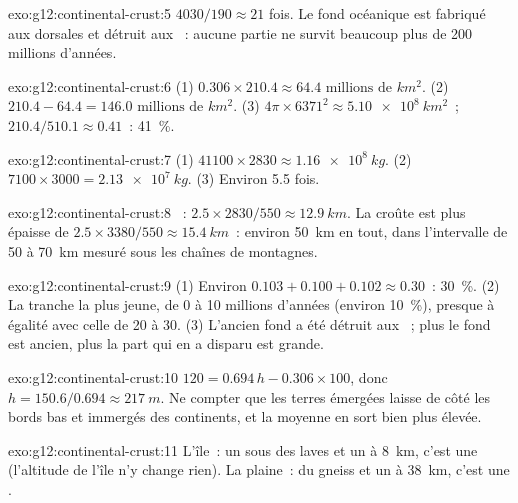 \begin{solution}{exo:g12:continental-crust:5}
$4030/190 \approx 21$ fois. Le fond océanique est fabriqué aux dorsales et
détruit aux ~: aucune partie ne survit beaucoup plus de
200 millions d'années.
\end{solution}

\begin{solution}{exo:g12:continental-crust:6}
(1) $0.306 \times 210.4 \approx \num{64.4}\text{ millions de }\unit{km^2}$.
(2) $210.4 - 64.4 = \num{146.0}\text{ millions de }\unit{km^2}$.
(3) $4\pi \times 6371^2 \approx \qty{5.10e8}{km^2}$~; $210.4/510.1 \approx
0.41$~: \qty{41}{\percent}.
\end{solution}

\begin{solution}{exo:g12:continental-crust:7}
(1) $41100 \times 2830 \approx \qty{1.16e8}{kg}$. (2) $7100 \times 3000 =
\qty{2.13e7}{kg}$. (3) Environ 5.5 fois.
\end{solution}

\begin{solution}{exo:g12:continental-crust:8}
~: $2.5 \times 2830/550 \approx \qty{12.9}{km}$. La croûte est plus
épaisse de $2.5 \times 3380/550 \approx \qty{15.4}{km}$~: environ
\qty{50}{km} en tout, dans l'intervalle de 50 à \qty{70}{km} mesuré sous
les chaînes de montagnes.
\end{solution}

\begin{solution}{exo:g12:continental-crust:9}
(1) Environ $0.103 + 0.100 + 0.102 \approx 0.30$~: \qty{30}{\percent}.
(2) La tranche la plus jeune, de 0 à 10 millions d'années (environ
\qty{10}{\percent}), presque à égalité avec celle de 20 à 30. (3) L'ancien
fond a été détruit aux ~; plus le fond est ancien, plus
la part qui en a disparu est grande.
\end{solution}

\begin{solution}{exo:g12:continental-crust:10}
$120 = 0.694\,h - 0.306 \times 100$, donc $h = 150.6/0.694 \approx
\qty{217}{m}$. Ne compter que les terres émergées laisse de côté les bords
bas et immergés des continents, et la moyenne en sort bien plus élevée.
\end{solution}

\begin{solution}{exo:g12:continental-crust:11}
L'île~: un  sous des laves et un  à \qty{8}{km}, c'est une  (l'altitude de l'île n'y change rien). La plaine~: du gneiss et un
 à \qty{38}{km}, c'est une .
\end{solution}

